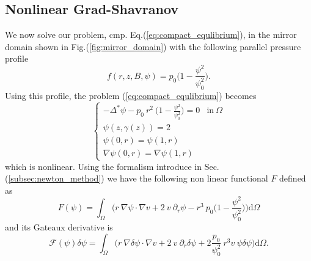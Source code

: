 \subsection{Nonlinear Grad-Shavranov}
We now solve our problem, cmp. Eq.(\ref{eq:compact_equlibrium}), in the mirror domain shown in Fig.(\ref{fig:mirror_domain}) with the following parallel pressure profile
\begin{equation}
  f(r,z,B,\psi)=p_0\big(1-\frac{\psi^2}{\psi^2_0}\big).
\end{equation}
Using this profile, the problem (\ref{eq:compact_equlibrium}) becomes
\begin{equation}
  \begin{cases}
    -\Delta^*\psi-p_0\:r^2\:\big(1-\frac{\psi^2}{\psi^2_0}\big)=0 & \mathrm{in}\:\Omega\\
    \psi(z,\gamma(z))=2\\
    \psi(0,r)=\psi(1,r)\\
    \nabla\psi(0,r)=\nabla\psi(1,r)
  \end{cases}
\end{equation}
which is nonlinear. Using the formalism introduce in Sec.(\ref{subsec:newton_method}) we have the following non linear functional $F$ defined as
\begin{equation}
  F(\psi)=\int_\Omega \bigg(r\:\nabla \psi \cdot\nabla v+2\:v\:\partial_r\psi-r^3\:p_0\big(1-\frac{\psi^2}{\psi^2_0}\big)\bigg)\mathrm{d}\Omega
\end{equation}
and its Gateaux derivative is
\begin{equation}
  \mathcal{F}(\psi)\delta \psi=\int_\Omega \bigg(r\:\nabla \delta\psi \cdot\nabla v+2\:v\:\partial_r\delta\psi+2\frac{p_0}{\psi^2_0}\:r^3v\:\psi\delta\psi\bigg)\mathrm{d}\Omega.
\end{equation}

